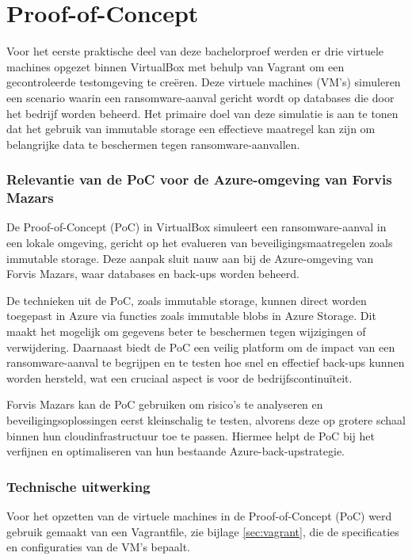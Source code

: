 \chapter{Proof-of-Concept}%
\label{ch:poc}
Voor het eerste praktische deel van deze bachelorproef werden er drie virtuele machines opgezet binnen VirtualBox met behulp van Vagrant om een gecontroleerde testomgeving te creëren. Deze virtuele machines (VM’s) simuleren een scenario waarin een ransomware-aanval gericht wordt op databases die door het bedrijf worden beheerd. Het primaire doel van deze simulatie is aan te tonen dat het gebruik van immutable storage een effectieve maatregel kan zijn om belangrijke data te beschermen tegen ransomware-aanvallen.
\subsection{Relevantie van de PoC voor de Azure-omgeving van Forvis Mazars}
De Proof-of-Concept (PoC) in VirtualBox simuleert een ransomware-aanval in een lokale omgeving, gericht op het evalueren van beveiligingsmaatregelen zoals immutable storage. Deze aanpak sluit nauw aan bij de Azure-omgeving van Forvis Mazars, waar databases en back-ups worden beheerd.

De technieken uit de PoC, zoals immutable storage, kunnen direct worden toegepast in Azure via functies zoals immutable blobs in Azure Storage. Dit maakt het mogelijk om gegevens beter te beschermen tegen wijzigingen of verwijdering. Daarnaast biedt de PoC een veilig platform om de impact van een ransomware-aanval te begrijpen en te testen hoe snel en effectief back-ups kunnen worden hersteld, wat een cruciaal aspect is voor de bedrijfscontinuïteit.

Forvis Mazars kan de PoC gebruiken om risico’s te analyseren en beveiligingsoplossingen eerst kleinschalig te testen, alvorens deze op grotere schaal binnen hun cloudinfrastructuur toe te passen. Hiermee helpt de PoC bij het verfijnen en optimaliseren van hun bestaande Azure-back-upstrategie.
\subsection{Technische uitwerking}
Voor het opzetten van de virtuele machines in de Proof-of-Concept (PoC) werd gebruik gemaakt van een Vagrantfile, zie bijlage \ref{sec:vagrant}, die de specificaties en configuraties van de VM’s bepaalt.

